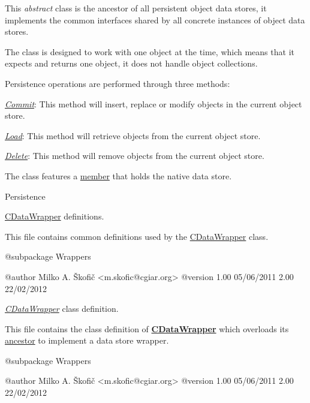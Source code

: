 This {\itshape abstract\/} class is the ancestor of all persistent object data stores, it implements the common interfaces shared by all concrete instances of object data stores.

The class is designed to work with one object at the time, which means that it expects and returns one object, it does not handle object collections.

Persistence operations are performed through three methods\-:


\begin{DoxyItemize}
\item {\itshape \hyperlink{}{Commit}\/}\-: This method will insert, replace or modify objects in the current object store. 
\item {\itshape \hyperlink{}{Load}\/}\-: This method will retrieve objects from the current object store. 
\item {\itshape \hyperlink{}{Delete}\/}\-: This method will remove objects from the current object store. 
\end{DoxyItemize}

The class features a \hyperlink{}{member} that holds the native data store.

Persistence

\hyperlink{class_c_data_wrapper}{C\-Data\-Wrapper} definitions.

This file contains common definitions used by the \hyperlink{class_c_data_wrapper}{C\-Data\-Wrapper} class.

\begin{DoxyVerb}    @subpackage     Wrappers

    @author         Milko A. Škofič <m.skofic@cgiar.org>
    @version        1.00 05/06/2011
                            2.00 22/02/2012\end{DoxyVerb}


{\itshape \hyperlink{class_c_data_wrapper}{C\-Data\-Wrapper}\/} class definition.

This file contains the class definition of {\bfseries \hyperlink{class_c_data_wrapper}{C\-Data\-Wrapper}} which overloads its \hyperlink{class_c_wrapper}{ancestor} to implement a data store wrapper.

\begin{DoxyVerb}    @subpackage     Wrappers

    @author         Milko A. Škofič <m.skofic@cgiar.org>
    @version        1.00 05/06/2011
                            2.00 22/02/2012\end{DoxyVerb}


